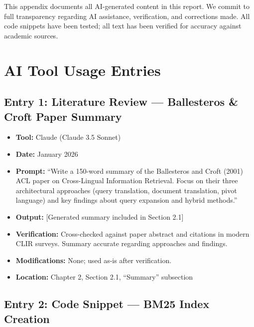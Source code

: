 \documentclass[12pt,a4paper]{report}
\begin{document}
This appendix documents all AI-generated content in this report. We commit to full transparency regarding AI assistance, verification, and corrections made. All code snippets have been tested; all text has been verified for accuracy against academic sources.

\section{AI Tool Usage Entries}

\subsection{Entry 1: Literature Review --- Ballesteros \& Croft Paper Summary}

\begin{itemize}
    \item \textbf{Tool:} Claude (Claude 3.5 Sonnet)
    \item \textbf{Date:} January 2026
    \item \textbf{Prompt:} ``Write a 150-word summary of the Ballesteros and Croft (2001) ACL paper on Cross-Lingual Information Retrieval. Focus on their three architectural approaches (query translation, document translation, pivot language) and key findings about query expansion and hybrid methods.''
    \item \textbf{Output:} [Generated summary included in Section 2.1]
    \item \textbf{Verification:} Cross-checked against paper abstract and citations in modern CLIR surveys. Summary accurate regarding approaches and findings.
    \item \textbf{Modifications:} None; used as-is after verification.
    \item \textbf{Location:} Chapter 2, Section 2.1, ``Summary'' subsection
\end{itemize}

\subsection{Entry 2: Code Snippet --- BM25 Index Creation}
\end{document}
